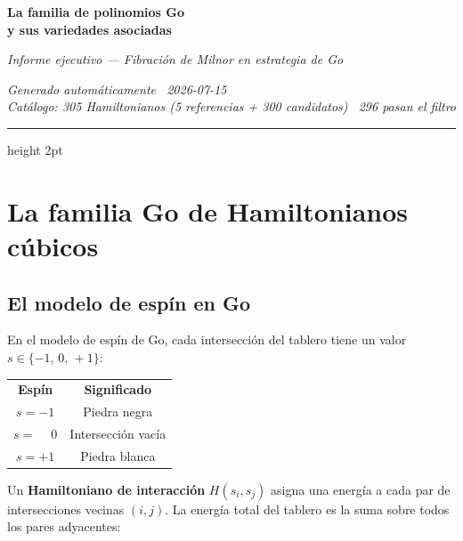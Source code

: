 \documentclass[11pt, a4paper]{article}
\newcommand{\TH}[1]{\cellcolor{cTHbg}\color{white}\textbf{#1}}
\begin{document}
\thispagestyle{fancy}

\vspace*{4pt}
{\color{cNavy}\Huge\bfseries La familia de polinomios Go}\\[3pt]
{\color{cNavy}\Large\bfseries y sus variedades asociadas}

\vspace{6pt}
{\color{cMuted}\large\itshape
  Informe ejecutivo --- Fibraci\'on de Milnor en estrategia de Go}

\vspace{4pt}
{\color{cMuted}\small\itshape Generado autom\'aticamente \textbullet\ 2026-07-15}\\[1pt]
{\color{cMuted}\small\itshape
  Cat\'alogo: 305 Hamiltonianos (5 referencias + 300 candidatos)
  \textbullet\ 296 pasan el filtro}

\vspace{8pt}
{\color{cAccent}\hrule height 2pt}
\vspace{10pt}

\section{La familia Go de Hamiltonianos c\'ubicos}

\subsection{El modelo de esp\'in en Go}

En el modelo de esp\'in de Go, cada intersecci\'on del tablero tiene un valor
$s \in \{-1,\,0,\,+1\}$:

\medskip
\begin{center}
\begin{tabular}{cc}
  \TH{Esp\'in} & \TH{Significado} \\[1pt]
  $s = -1$ & Piedra negra \\
  $s = \phantom{-}0$  & Intersecci\'on vac\'ia \\
  $s = +1$ & Piedra blanca \\
\end{tabular}
\end{center}
\medskip

Un \textbf{Hamiltoniano de interacci\'on} $H(s_i, s_j)$ asigna una energ\'ia
a cada par de intersecciones vecinas $(i,j)$. La energ\'ia total del tablero
es la suma sobre todos los pares adyacentes:
\end{document}

